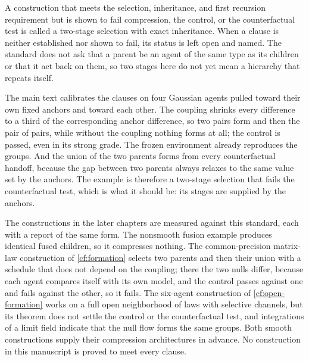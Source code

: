 A construction that meets the selection, inheritance, and first recursion
requirement but is shown to fail compression, the control, or the
counterfactual test is called a two-stage selection with exact inheritance.
When a clause is neither established nor shown to fail, its status is left
open and named. The standard does not ask that a parent be an agent of the
same type as its children or that it act back on them, so two stages here do
not yet mean a hierarchy that repeats itself.

The main text calibrates the clauses on four Gaussian agents pulled toward
their own fixed anchors and toward each other. The coupling shrinks every
difference to a third of the corresponding anchor difference, so two pairs
form and then the pair of pairs, while without the coupling nothing forms at
all; the control is passed, even in its strong grade. The frozen
environment already reproduces the groups. And the union of the two parents
forms from every counterfactual handoff, because the gap between two parents
always relaxes to the same value set by the anchors. The example is
therefore a two-stage selection that fails the counterfactual test, which is
what it should be: its stages are supplied by the anchors.

The constructions in the later chapters are measured against this standard,
each with a report of the same form. The nonsmooth fusion example produces
identical fused children, so it compresses nothing. The common-precision
matrix-law construction of \cref{cf:formation} selects two parents and then
their union with a schedule that does not depend on the coupling; there the
two nulls differ, because each agent compares itself with its own model, and
the control passes against one and fails against the other, so it fails. The
six-agent construction of \cref{cf:open-formation} works on a full open
neighborhood of laws with selective channels, but its theorem does not
settle the control or the counterfactual test, and integrations of a limit
field indicate that the null flow forms the same groups. Both smooth
constructions supply their compression architectures in advance. No
construction in this manuscript is proved to meet every clause.
